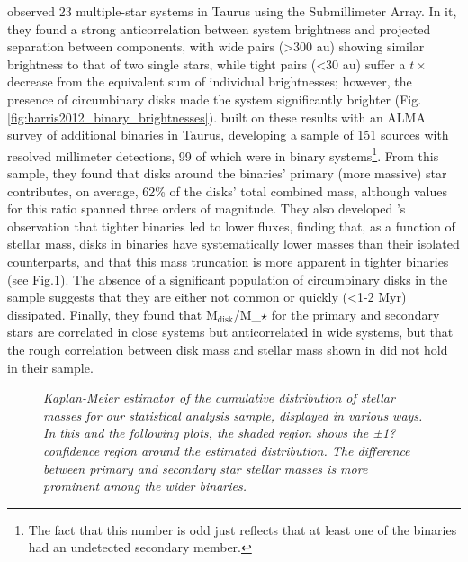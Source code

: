 \citet{Harris2012} observed 23 multiple-star systems in Taurus using the Submillimeter Array. In it, they found a strong anticorrelation between system brightness and projected separation between components, with wide pairs (\textgreater300 au) showing similar brightness to that of two single stars, while tight pairs (\textless30 au) suffer a $t\times$ decrease from the equivalent sum of individual brightnesses; however, the presence of circumbinary disks made the system significantly brighter (Fig.\ref{fig:harris2012_binary_brightnesses}). \citet{Akeson2019} built on these results with an ALMA survey of additional binaries in Taurus, developing a sample of 151 sources with resolved millimeter detections, 99 of which were in binary systems\footnote{The fact that this number is odd just reflects that at least one of the binaries had an undetected secondary member.}. From this sample, they found that disks around the binaries' primary (more massive) star contributes, on average, 62\% of the disks' total combined mass, although values for this ratio spanned three orders of magnitude. They also developed \citet{Harris2012}'s observation that tighter binaries led to lower fluxes, finding that, as a function of stellar mass, disks in binaries have systematically lower masses than their isolated counterparts, and that this mass truncation is more apparent in tighter binaries (see Fig.\ref{fig:taurus_binaries}). The absence of a significant population of circumbinary disks in the sample suggests that they are either not common or quickly (\textless1-2 Myr) dissipated. Finally, they found that M$_\text{disk}$/M_$\star$ for the primary and secondary stars are correlated in close systems but anticorrelated in wide systems, but that the rough correlation between disk mass and stellar mass shown in \citet{Andrews2013} did not hold in their sample.


\begin{figure}[t]
  \caption{\textit{Kaplan-Meier estimator of the cumulative distribution of stellar masses for our statistical analysis sample, displayed in various ways. In this and the following plots, the shaded region shows the ±1? confidence region around the estimated distribution. The difference between primary and secondary star stellar masses is more prominent among the wider binaries.}}
  \label{fig:taurus_binaries}
\end{figure}



